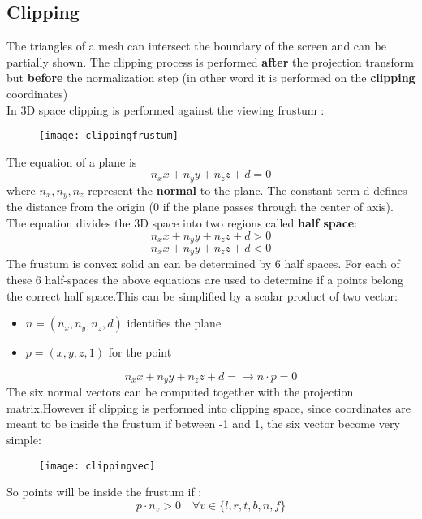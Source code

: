 \subsection{Clipping}
The triangles of a mesh can intersect the boundary of the screen and can be partially shown. The clipping process is performed \textbf{after} the projection transform but \textbf{before} the normalization step (in other word it is performed on the \textbf{clipping } coordinates)\\
In 3D space clipping is performed against the viewing frustum :
\begin{figure}[H]
  \centering
  \texttt{[image: clippingfrustum]}
\end{figure} 
The equation of a plane is $$ n_x x + n_y y +n_z z + d = 0$$ where $n_x,n_y,n_z$ represent the \textbf{normal} to the plane. The constant term d  defines the distance from the origin (0 if the plane passes through the center of axis). The equation divides the 3D space into two regions called \textbf{half space}:
$$ n_x x + n_y y +n_z z + d > 0$$ $$ n_x x + n_y y +n_z z + d < 0$$
The frustum is convex solid an can be determined by 6 half spaces. For each of these 6 half-spaces the above equations are used to determine if a points belong the correct half space.This can be simplified by a scalar product of two vector:
\begin{itemize}
\item  $n=(n_x,n_y,n_z,d)$ identifies the plane
\item  $p=(x,y,z,1)$ for the point
\end{itemize}
$$ n_x x + n_y y +n_z z + d =  \to n \cdot p = 0$$
The six normal vectors can be computed together with the projection matrix.However if clipping is performed into clipping space, since coordinates are meant to be inside the frustum if between -1 and 1, the six vector become very simple:
\begin{figure}[H]
  \centering
  \texttt{[image: clippingvec]}
\end{figure}
So points will be inside the frustum if :
\[
\boxed{p \cdot n_v > 0 \quad \forall v \in \{l,r,t,b,n,f\}}
\]

